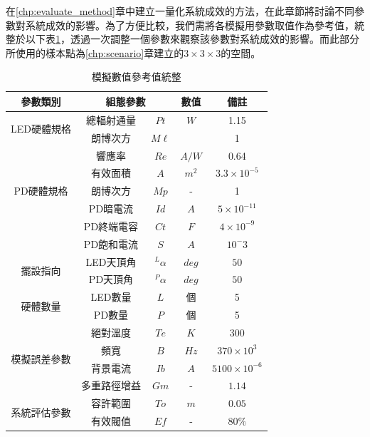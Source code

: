 在\ref{chp:evaluate_method}章中建立一量化系統成效的方法，在此章節將討論不同參數對系統成效的影響。為了方便比較，我們需將各模擬用參數取值作為參考值，統整於以下表\ref{tab:para_reference}，透過一次調整一個參數來觀察該參數對系統成效的影響。而此部分所使用的樣本點為\ref{chp:scenario}章建立的$3\times 3\times 3$的空間。

\begin{table}[htpb]
    \begin{center}
      \caption{模擬數值參考值統整}
      \label{tab:para_reference}
      \begin{tabular}{|c|cc|c|c|} %
        \hline
        \textbf{參數類別}&\multicolumn{2}{|c|}{\textbf{組態參數}}  &\textbf{數值}  &  \textbf{備註}   \\
        \hline
        \multirow{2}{*}{LED硬體規格}
        & 總輻射通量 &$Pt$ & $W$ & 1.15\\
        &朗博次方& $M\ell$& &1 \\
        \hline

        \multirow{5}{*}{PD硬體規格}
        &響應率 &$Re$ & $A/W$ & 0.64\\
        &有效面積& $A$& $m^2$ &$3.3\times 10^{-5}$\\
        &朗博次方& $Mp$& - &1\\
        &PD暗電流 &$Id$ & $A$& $5\times 10^{-11}$\\
        &PD終端電容 &$Ct$ & $F$ &$4\times 10^{-9}$\\
        &PD飽和電流& $S$ &$A$&$10^-3$\\
        \hline

        \multirow{2}{*}{擺設指向}
        &LED天頂角 &$^L \alpha$ & $deg$&$50$\\
        &PD天頂角 &$^P \alpha$ & $deg$&$50$\\
        \hline

        \multirow{2}{*}{硬體數量}
        &LED數量 &$L$ & 個&5\\
        &PD數量 &$P$ & 個&5\\
        \hline

        \multirow{4}{*}{模擬誤差參數}
        &絕對溫度 &$Te$ & $K$ &  $300$\\
        &頻寬 &$B$ & $Hz$ &  $370\times 10^{3}$\\
        &背景電流&$Ib$&$A$&$5100\times 10^{-6}$\\
        &多重路徑增益&$Gm$&-&$1.14$\\
        \hline

        \multirow{2}{*}{系統評估參數}
        &容許範圍&$To$&$m$&$0.05$\\
        &有效閥值&$Ef$&-&$80\%$\\
        \hline


      \end{tabular}
    \end{center}
  \end{table}

